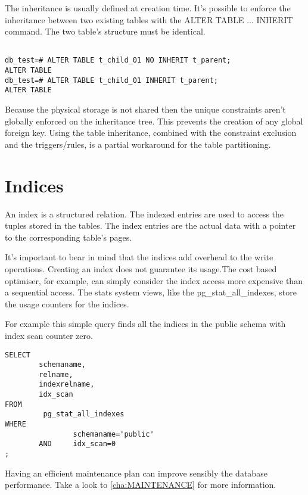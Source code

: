 The inheritance is usually defined at creation time. It's possible to enforce the inheritance
between two existing tables with the ALTER TABLE ... INHERIT command. The two table's structure
must be identical.

\begin{lstlisting}[style=pgsql]

db_test=# ALTER TABLE t_child_01 NO INHERIT t_parent;
ALTER TABLE
db_test=# ALTER TABLE t_child_01 INHERIT t_parent;
ALTER TABLE

\end{lstlisting}

Because the physical storage is not shared then the unique constraints aren't globally enforced on
the inheritance tree. This prevents the creation of any global foreign key. Using the table
inheritance, combined with the constraint exclusion and the triggers/rules, is a partial workaround
for the table partitioning.

\section{Indices}
An index is a structured relation. The indexed entries are used to access the tuples stored in the
tables. The index entries are the actual data with a pointer to the corresponding table's pages.\newline

It's important to bear in mind that the indices add overhead to the write operations. Creating an index
does not guarantee its usage.The cost based optimiser, for example, can simply consider the index access
more expensive than a sequential access. The stats system views, like the pg\_stat\_all\_indexes,
store the usage counters for the indices.\newline

For example this simple query finds all the indices in the public schema with index scan counter zero.

\begin{lstlisting}[style=pgsql]
SELECT
        schemaname,
        relname,
        indexrelname,
        idx_scan
FROM
         pg_stat_all_indexes
WHERE
                schemaname='public'
        AND     idx_scan=0
;

\end{lstlisting}

Having an efficient maintenance plan can improve sensibly the database performance. Take a look to
\ref{cha:MAINTENANCE} for more information.

